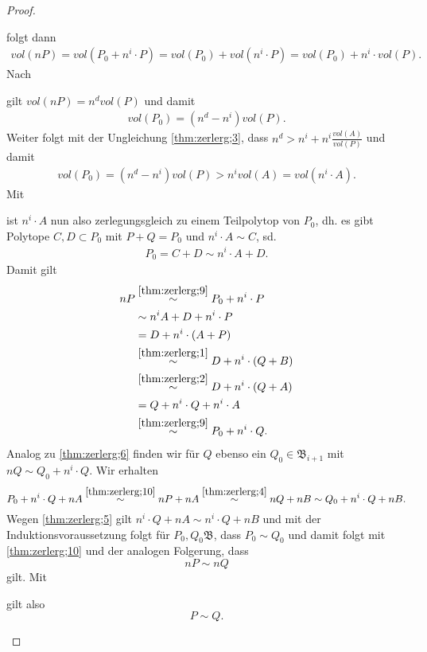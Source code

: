 \documentclass[11pt,titlepage]{article}
\theoremstyle{definition}
\theoremstyle{remark}
\begin{document}
\begin{proof}
\begin{itemize}
			
			folgt dann
			\begin{align*}
				vol(nP)=vol(P_0+n^i\cdot P)=vol(P_0)+vol(n^i\cdot P)=vol(P_0)+
				n^i\cdot vol(P).
			\end{align*}
			Nach 
			
			
			gilt $vol(nP)=n^d vol(P)$ und damit 
			\begin{align}
				vol(P_0)=(n^d -n^i)vol(P). \label{thm:zerlerg;7}
			\end{align}
			Weiter folgt mit der Ungleichung \ref{thm:zerlerg;3}, dass 
			$n^d > n^i+n^i\frac{vol(A)}{vol(P)}$ und damit
			\begin{align}
				vol(P_0)=(n^d -n^i)vol(P)>n^i vol(A)=vol(n^i\cdot A) \label{thm:zerlerg;8}.
			\end{align}
			Mit
			
			
			ist $n^i\cdot A$ nun also zerlegungsgleich zu einem Teilpolytop von $P_0$, dh. es gibt Polytope $C,D\subset P_0$ mit $P+Q=P_0$ und $n^i\cdot A\sim C$, sd. 
			\begin{align}
				P_0=C+D\sim n^i\cdot A+D. \label{thm:zerlerg;9}
			\end{align}
			Damit gilt 
			\begin{align}
				nP &\overset{\ref{thm:zerlerg;9}}{\sim} P_0+n^i \cdot P \notag\\
				&\sim n^iA +D+n^i \cdot P \notag\\
				&=D+n^i\cdot(A+P) \notag\\ &\overset{\ref{thm:zerlerg;1}}{\sim} D+n^i\cdot(Q+B) \notag\\
				&\overset{\ref{thm:zerlerg;2}}{\sim} D+n^i\cdot(Q+A) \notag\\
				&=Q+n^i\cdot Q +n^i\cdot A \notag\\
				&\overset{\ref{thm:zerlerg;9}}{\sim} P_0+n^i \cdot Q. \label{thm:zerlerg;10}
			\end{align}
			Analog zu \ref{thm:zerlerg;6} finden wir für $Q$ ebenso ein 
			$Q_0\in\mathfrak{B}_{i+1}$ mit $nQ\sim Q_0+n^i\cdot Q$. Wir erhalten 
			\[P_0+n^i\cdot Q+nA\overset{\ref{thm:zerlerg;10}}{\sim}
			nP+nA\overset{\ref{thm:zerlerg;4}}{\sim}nQ+nB\sim Q_0+n^i\cdot Q+nB.\]
			Wegen \ref{thm:zerlerg;5} gilt $n^i\cdot Q+nA\sim n^i\cdot Q +nB$ und 
			mit der Induktionsvoraussetzung folgt für $P_0,Q_0\mathfrak{B}$, dass 
			$P_0\sim Q_0$ und damit folgt mit \ref{thm:zerlerg;10} und der 
			analogen Folgerung, dass 
			\[nP\sim nQ\]
			gilt. Mit
			
			
			gilt also \[P\sim Q.\]
		\end{itemize}
	\end{proof}
	
	
	\newpage
	
	
\end{document}
